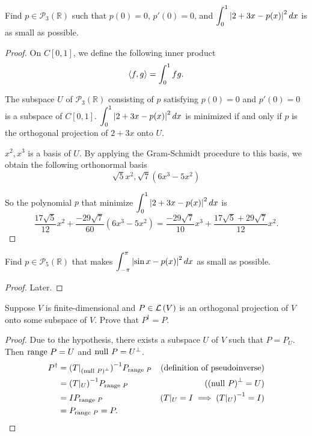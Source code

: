 \begin{exercise}
    Find $p\in \mathscr{P}_{3}(\mathbb{R})$ such that $p(0) = 0$, $p'(0) = 0$, and $\displaystyle\int^{1}_{0}\left\vert{2 + 3x - p(x)}\right\vert^{2}dx$ is as small as possible.
\end{exercise}

\begin{proof}
    On $C[0, 1]$, we define the following inner product
    \[
        \left\langle{f, g}\right\rangle = \int^{1}_{0}fg.
    \]

    The subspace $U$ of $\mathscr{P}_{3}(\mathbb{R})$ consisting of $p$ satisfying $p(0) = 0$ and $p'(0) = 0$ is a subspace of $C[0, 1]$. $\displaystyle\int^{1}_{0}\left\vert{2 + 3x - p(x)}\right\vert^{2}dx$ is minimized if and only if $p$ is the orthogonal projection of $2 + 3x$ onto $U$.

    $x^{2}, x^{3}$ is a basis of $U$. By applying the Gram-Schmidt procedure to this basis, we obtain the following orthonormal basis
    \[
        \sqrt{5}x^{2}, \sqrt{7}(6x^{3} - 5x^{2})
    \]

    So the polynomial $p$ that minimize $\displaystyle\int^{1}_{0}\left\vert{2 + 3x - p(x)}\right\vert^{2}dx$ is
    \[
        \frac{17\sqrt{5}}{12}x^{2} + \frac{-29\sqrt{7}}{60}(6x^{3} - 5x^{2}) = \frac{-29\sqrt{7}}{10}x^{3} + \frac{17\sqrt{5} + 29\sqrt{7}}{12}x^{2}.
    \]
\end{proof}
\newpage

\begin{exercise}
    Find $p\in \mathscr{P}_{5}(\mathbb{R})$ that makes $\displaystyle\int^{\pi}_{-\pi}\left\vert{\sin x - p(x)}\right\vert^{2}dx$ as small as possible.
\end{exercise}

\begin{proof}
    Later.
\end{proof}
\newpage

\begin{exercise}
    Suppose $V$ is finite-dimensional and $P \in \mathcal{L}\left({V}\right)$ is an orthogonal projection of $V$ onto some subspace of $V$. Prove that $P^{\dagger} = P$.
\end{exercise}

\begin{proof}
    Due to the hypothesis, there exists a subspace $U$ of $V$ such that $P = P_{U}$. Then $\operatorname{range}\,{P} = U$ and $\operatorname{null}\,{P} = U^{\bot}$.
    \begin{align*}
        P^{\dagger} & = {(T\vert_{{(\operatorname{null}\,{P})}^{\bot}})}^{-1}P_{\operatorname{range}\,{P}} & \text{(definition of pseudoinverse)}              \\
                    & = {(T\vert_{U})}^{-1}P_{\operatorname{range}\,{P}}                     & ({(\operatorname{null}\,{P})}^{\bot} = U)                       \\
                    & = IP_{\operatorname{range}\,{P}}                                       & (T\vert_{U} = I \implies {(T\vert_{U})}^{-1} = I) \\
                    & = P_{\operatorname{range}\,{P}} = P.
    \end{align*}
\end{proof}
\newpage

